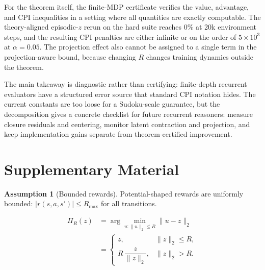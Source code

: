 \documentclass{article}
\theoremstyle{plain}
\theoremstyle{definition}
\newtheorem{assumption}[theorem]{Assumption}
\theoremstyle{remark}
\begin{document}
For the theorem itself, the finite-MDP certificate verifies the value, advantage, and CPI inequalities in a setting where all quantities are exactly computable. The theory-aligned episodic-$z$ rerun on the hard suite reaches $0\%$ at 20k environment steps, and the resulting CPI penalties are either infinite or on the order of $5\times 10^3$ at $\alpha{=}0.05$. The projection effect also cannot be assigned to a single term in the projection-aware bound, because changing $R$ changes training dynamics outside the theorem.

The main takeaway is diagnostic rather than certifying: finite-depth recurrent evaluators have a structured error source that standard CPI notation hides. The current constants are too loose for a Sudoku-scale guarantee, but the decomposition gives a concrete checklist for future recurrent reasoners: measure closure residuals and centering, monitor latent contraction and projection, and keep implementation gains separate from theorem-certified improvement.







\clearpage
\appendix
{}

\section{Supplementary Material}
\label{app:supplementary}

\begin{assumption}[Bounded rewards]
\label{ass:bounded}
Potential-shaped rewards are uniformly bounded: $|r(s,a,s')|\le R_{\max}$ for all transitions.
\end{assumption}

\begin{equation}
\begin{split}
\Pi_R(z) &= \arg\min_{u:\|u\|_2\le R}\|u-z\|_2 \\
&=
\begin{cases}
z, & \|z\|_2 \le R,\\[2pt]
R\,\dfrac{z}{\|z\|_2}, & \|z\|_2 > R.
\end{cases}
\end{split}
\label{eq:projection}
\end{equation}
\end{document}
